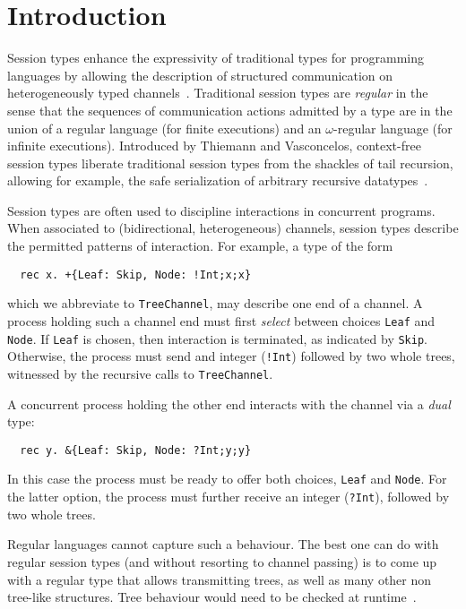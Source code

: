 \section{Introduction}
\label{sec:introduction}

Session types enhance the expressivity of traditional types for
programming languages by allowing the description of structured
communication on heterogeneously typed
channels~\cite{DBLP:conf/concur/Honda93,DBLP:conf/esop/HondaVK98,DBLP:conf/parle/TakeuchiHK94}.
%
Traditional session types are \emph{regular} in the sense that the
sequences of communication actions admitted by a type are in the union
of a regular language (for finite executions) and an $\omega$-regular
language (for infinite executions).
%
Introduced by Thiemann and Vasconcelos, context-free session types
liberate traditional session types from the shackles of tail
recursion, allowing for example, the safe serialization of arbitrary
recursive datatypes~\cite{thiemann2016context}.

Session types are often used to discipline interactions in concurrent
programs. When associated to (bidirectional, heterogeneous) channels,
session types describe the permitted patterns of interaction. For
example, a type of the form
%
\begin{lstlisting}
  rec x. +{Leaf: Skip, Node: !Int;x;x}
\end{lstlisting}
%
which we abbreviate to \lstinline|TreeChannel|, may describe one end
of a channel. A process holding such a channel end must first
\emph{select} between choices \lstinline|Leaf| and
\lstinline|Node|. If \lstinline|Leaf| is chosen, then interaction is
terminated, as indicated by \lstinline|Skip|. Otherwise, the process
must send and integer (\lstinline|!Int|) followed by two whole trees,
witnessed by the recursive calls to \lstinline|TreeChannel|.

A concurrent process holding the other end interacts with the channel
via a \emph{dual} type:
%
\begin{lstlisting}
  rec y. &{Leaf: Skip, Node: ?Int;y;y}
\end{lstlisting}
%
In this case the process must be ready to offer both choices,
\lstinline|Leaf| and \lstinline|Node|. For the latter option, the
process must further receive an integer (\lstinline|?Int|), followed
by two whole trees.

Regular languages cannot capture such a behaviour. The best one can do
with regular session types (and without resorting to channel passing)
is to come up with a regular type that allows transmitting trees, as
well as many other non tree-like structures. Tree behaviour would need
to be checked at runtime~\cite{almeida.etal_freest-functional-language,thiemann2016context}.

